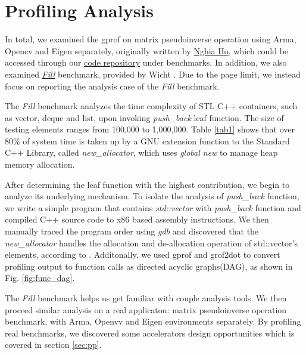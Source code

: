 \documentclass[9pt]{article}
\begin{document}
\section{Profiling Analysis}\label{sec:pa}

In total, we examined the gprof on matrix pseudoinverse operation using Arma, Opencv and Eigen separately, originally written by \href{http://nghiaho.com/?p=1726}{Nghia Ho}, which could be accessed through our \href{https://github.com/tzrtzr000/AccPlusPlus/benchmarks}{code repository} under benchmarks. In addition, we also examined \href{https://baptiste-wicht.com/posts/2017/05/cpp-containers-benchmark-vector-list-deque-plf-colony.html#fill}{\textit{Fill}} benchmark, provided by Wicht \cite{wicht_2017}. Due to the page limit, we instead focus on reporting the analysis case of the \textit{Fill} benchmark.

The \textit{Fill} benchmark analyzes the time complexity of STL C++ containers, such as vector, deque and list, upon invoking \textit{push\_back} leaf function. The size of testing elements ranges from 100,000 to 1,000,000. Table \ref{tab1} shows that over 80\% of system time is taken up by a GNU extension function to the Standard C++ Library, called \textit{new\_allocator}\cite{libstdc}, which uses \textit{global new} to manage heap memory allocation. 

After determining the leaf function with the highest contribution, we begin to analyze its underlying mechanism. To isolate the analysis of \textit{push\_back} function, we write a simple program that contains \textit{std::vector} with \textit{push\_back} function and compiled C++ source code to x86 based assembly instructions. We then manually traced the program order using \textit{gdb} and discovered that the \textit{new\_allocator} handles the allocation and de-allocation operation of std::vector's elements, according to \cite{libstdc}. Additonally, we used gprof and grof2dot to convert profiling output to function calls as directed acyclic graphs(DAG), as shown in Fig. \ref{fig:func_dag}.

The \textit{Fill} benchmark helps us get familiar with couple analysis tools. We then proceed similar analysis on a real applicaton: matrix pseudoinverse operation benchmark, with Arma, Openvv and Eigen environments separately. By profiling real benchmarks, we discovered some accelerators design opportunities which is covered in section \ref{sec:pp}.
\end{document}

